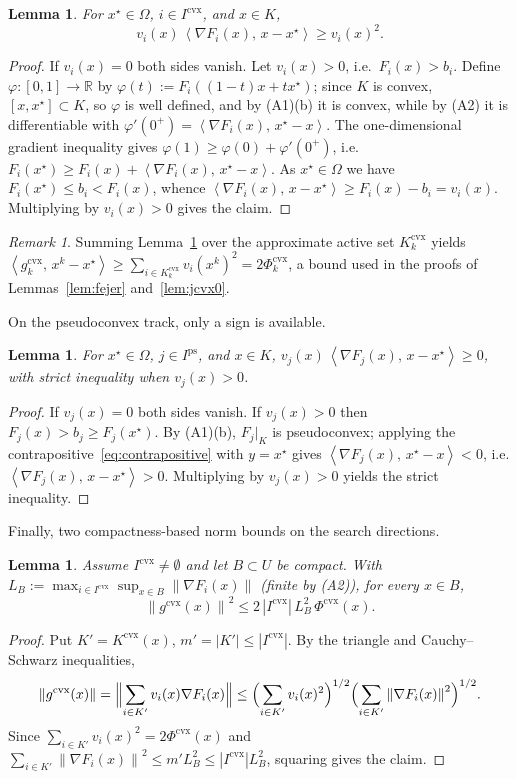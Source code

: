 \documentclass[]{interact}
\theoremstyle{plain}
\newtheorem{lemma}[theorem]{Lemma}
\theoremstyle{definition}
\theoremstyle{remark}
\newtheorem{remark}{Remark}
\newcommand{\R}{\mathbb{R}}
\newcommand{\norm}[1]{\left\lVert #1 \right\rVert}
\newcommand{\abs}[1]{\left\lvert #1 \right\rvert}
\newcommand{\inner}[2]{\left\langle #1,\, #2 \right\rangle}
\newcommand{\cvx}{\mathrm{cvx}}
\newcommand{\ps}{\mathrm{ps}}
\begin{document}
\begin{lemma}\label{lem:grad-cvx}
For $x^\star\in\Omega$, $i\in I^{\cvx}$, and $x\in K$,
\[
v_i(x)\,\inner{\nabla F_i(x)}{x-x^\star}\ge v_i(x)^2 .
\]
\end{lemma}
\begin{proof}
If $v_i(x)=0$ both sides vanish. Let $v_i(x)>0$, i.e.\ $F_i(x)>b_i$. Define
$\varphi:[0,1]\to\R$ by $\varphi(t):=F_i((1-t)x+tx^\star)$; since $K$ is convex,
$[x,x^\star]\subset K$, so $\varphi$ is well defined, and by (A1)(b) it is convex, while
by (A2) it is differentiable with $\varphi'(0^+)=\inner{\nabla F_i(x)}{x^\star-x}$. The
one-dimensional gradient inequality gives $\varphi(1)\ge\varphi(0)+\varphi'(0^+)$, i.e.
$F_i(x^\star)\ge F_i(x)+\inner{\nabla F_i(x)}{x^\star-x}$. As $x^\star\in\Omega$ we have
$F_i(x^\star)\le b_i<F_i(x)$, whence
$\inner{\nabla F_i(x)}{x-x^\star}\ge F_i(x)-b_i=v_i(x)$. Multiplying by $v_i(x)>0$ gives
the claim.
\end{proof}

\begin{remark}\label{rem:grad-cvx-sum}
Summing Lemma~\ref{lem:grad-cvx} over the approximate active set $K^{\cvx}_k$ yields
$\inner{g^{\cvx}_k}{x^k-x^\star}\ge\sum_{i\in K^{\cvx}_k}v_i(x^k)^2=2\Phi^{\cvx}_k$, a bound
used in the proofs of Lemmas~\ref{lem:fejer} and~\ref{lem:jcvx0}.
\end{remark}

On the pseudoconvex track, only a sign is available.

\begin{lemma}\label{lem:sign-ps}
For $x^\star\in\Omega$, $j\in I^{\ps}$, and $x\in K$,
$v_j(x)\,\inner{\nabla F_j(x)}{x-x^\star}\ge 0$, with strict inequality when $v_j(x)>0$.
\end{lemma}
\begin{proof}
If $v_j(x)=0$ both sides vanish. If $v_j(x)>0$ then $F_j(x)>b_j\ge F_j(x^\star)$. By
(A1)(b), $F_j|_K$ is pseudoconvex; applying the contrapositive~\eqref{eq:contrapositive}
with $y=x^\star$ gives $\inner{\nabla F_j(x)}{x^\star-x}<0$, i.e.
$\inner{\nabla F_j(x)}{x-x^\star}>0$. Multiplying by $v_j(x)>0$ yields the strict
inequality.
\end{proof}

Finally, two compactness-based norm bounds on the search directions.

\begin{lemma}\label{lem:bound-cvx}
Assume $I^{\cvx}\ne\emptyset$ and let $B\subset U$ be compact. With
$L_B:=\max_{i\in I^{\cvx}}\sup_{x\in B}\norm{\nabla F_i(x)}$ (finite by (A2)), for every
$x\in B$,
\[
\norm{g^{\cvx}(x)}^2\le 2\,\abs{I^{\cvx}}\,L_B^2\,\Phi^{\cvx}(x).
\]
\end{lemma}
\begin{proof}
Put $K'=K^{\cvx}(x)$, $m'=\abs{K'}\le\abs{I^{\cvx}}$. By the triangle and Cauchy--Schwarz
inequalities,
\[
\norm{g^{\cvx}(x)}=\Bigl\|\sum_{i\in K'}v_i(x)\nabla F_i(x)\Bigr\|
\le\Bigl(\sum_{i\in K'}v_i(x)^2\Bigr)^{1/2}\Bigl(\sum_{i\in K'}\norm{\nabla F_i(x)}^2\Bigr)^{1/2}.
\]
Since $\sum_{i\in K'}v_i(x)^2=2\Phi^{\cvx}(x)$ and
$\sum_{i\in K'}\norm{\nabla F_i(x)}^2\le m'L_B^2\le\abs{I^{\cvx}}L_B^2$, squaring gives the
claim.
\end{proof}
\end{document}
